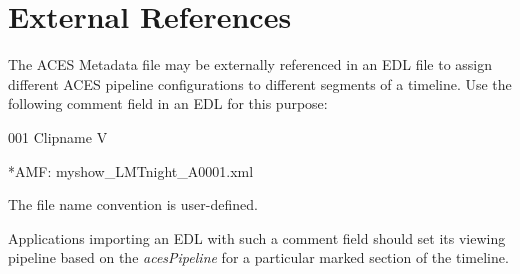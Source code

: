 \regularsectionformat	%
\chapter{External References}

The ACES Metadata file may be externally referenced in an EDL file to assign different ACES pipeline configurations to different segments of a timeline.    Use the following comment field in an EDL for this purpose:

001 Clipname  V             %

*AMF:   myshow\_LMTnight\_A0001.xml

The file name convention is user-defined.

Applications importing an EDL with such a comment field should set its viewing pipeline based on the \textit{acesPipeline} for a particular marked section of the timeline.

